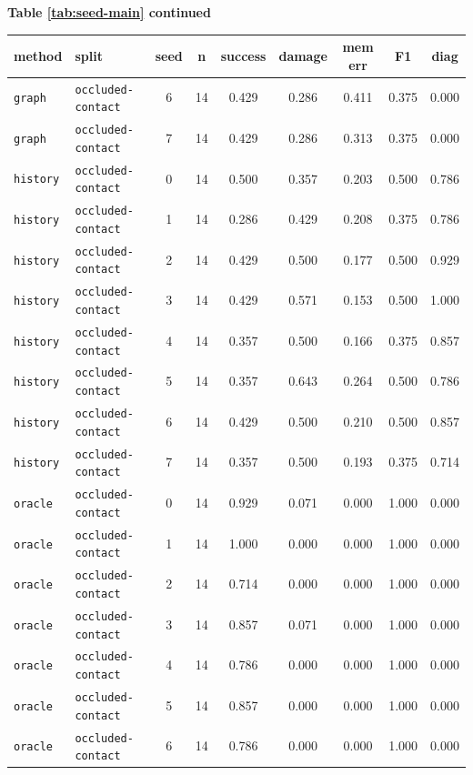 \documentclass{article}
\begin{document}
\begin{center}
\textbf{Table \ref{tab:seed-main} continued}\\[0.4ex]
\begin{tabular}{llccccccc}
\toprule
method & split & seed & n & success & damage & mem err & F1 & diag \\
\midrule
\texttt{graph} & \texttt{occluded-contact} & 6 & 14 & 0.429 & 0.286 & 0.411 & 0.375 & 0.000 \\
\texttt{graph} & \texttt{occluded-contact} & 7 & 14 & 0.429 & 0.286 & 0.313 & 0.375 & 0.000 \\
\texttt{history} & \texttt{occluded-contact} & 0 & 14 & 0.500 & 0.357 & 0.203 & 0.500 & 0.786 \\
\texttt{history} & \texttt{occluded-contact} & 1 & 14 & 0.286 & 0.429 & 0.208 & 0.375 & 0.786 \\
\texttt{history} & \texttt{occluded-contact} & 2 & 14 & 0.429 & 0.500 & 0.177 & 0.500 & 0.929 \\
\texttt{history} & \texttt{occluded-contact} & 3 & 14 & 0.429 & 0.571 & 0.153 & 0.500 & 1.000 \\
\texttt{history} & \texttt{occluded-contact} & 4 & 14 & 0.357 & 0.500 & 0.166 & 0.375 & 0.857 \\
\texttt{history} & \texttt{occluded-contact} & 5 & 14 & 0.357 & 0.643 & 0.264 & 0.500 & 0.786 \\
\texttt{history} & \texttt{occluded-contact} & 6 & 14 & 0.429 & 0.500 & 0.210 & 0.500 & 0.857 \\
\texttt{history} & \texttt{occluded-contact} & 7 & 14 & 0.357 & 0.500 & 0.193 & 0.375 & 0.714 \\
\texttt{oracle} & \texttt{occluded-contact} & 0 & 14 & 0.929 & 0.071 & 0.000 & 1.000 & 0.000 \\
\texttt{oracle} & \texttt{occluded-contact} & 1 & 14 & 1.000 & 0.000 & 0.000 & 1.000 & 0.000 \\
\texttt{oracle} & \texttt{occluded-contact} & 2 & 14 & 0.714 & 0.000 & 0.000 & 1.000 & 0.000 \\
\texttt{oracle} & \texttt{occluded-contact} & 3 & 14 & 0.857 & 0.071 & 0.000 & 1.000 & 0.000 \\
\texttt{oracle} & \texttt{occluded-contact} & 4 & 14 & 0.786 & 0.000 & 0.000 & 1.000 & 0.000 \\
\texttt{oracle} & \texttt{occluded-contact} & 5 & 14 & 0.857 & 0.000 & 0.000 & 1.000 & 0.000 \\
\texttt{oracle} & \texttt{occluded-contact} & 6 & 14 & 0.786 & 0.000 & 0.000 & 1.000 & 0.000 \\

\end{tabular}
\end{center}
\end{document}
